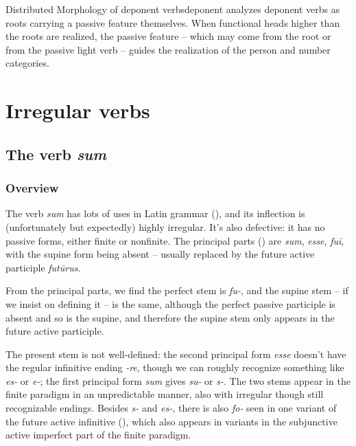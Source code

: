 \documentclass[a4paper, oneside]{report}
\newcommand{\corpus}[1]{\emph{#1}}
\begin{document}
\begin{theorybox}{Distributed Morphology of deponent verbs}{deponent}
    \citet{embick2000features} analyzes deponent verbs as roots carrying a passive feature themselves.
    When functional heads higher than the roots are realized,
    the passive feature -- which may come from the root or from the passive light verb -- 
    guides the realization of the person and number categories.
\end{theorybox}



\section{Irregular verbs}\label{sec:irregular-verbs}

\subsection{The verb \corpus{sum}}\label{sec:sum-morphology}

\subsubsection{Overview}

The verb \corpus{sum} has lots of uses in Latin grammar (),
and its inflection is (unfortunately but expectedly) highly irregular.
It's also defective: 
it has no passive forms, either finite or nonfinite.
The principal parts () are 
\corpus{sum}, \corpus{esse}, \corpus{fuī}, 
with the supine form being absent -- usually replaced by the future active participle \corpus{futūrus}.

From the principal parts, 
we find the perfect stem is \corpus{fu-}, 
and the supine stem -- if we insist on defining it -- 
is the same, 
although the perfect passive participle is absent and so is the supine,
and therefore the supine stem only appears in the future active participle.

The present stem is not well-defined:
the second principal form \corpus{esse}
doesn't have the regular infinitive ending \corpus{-re},
though we can roughly recognize something like \corpus{es-} or \corpus{e-};
the first principal form \corpus{sum} gives \corpus{su-} or \corpus{s-}.
The two stems appear in the finite paradigm in an unpredictable manner, 
also with irregular though still recognizable endings.
Besides \corpus{s-} and \corpus{es-},
there is also \corpus{fo-} seen in one variant of the future active infinitive
(),
which also appears in variants in
the subjunctive active imperfect part of the finite paradigm.
\end{document}

